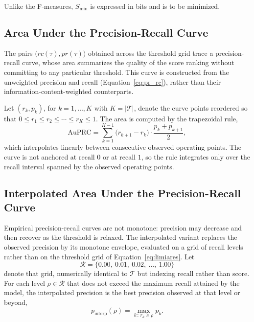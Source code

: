 \documentclass[Ingles]{ic-tese-v3}
\begin{document}
Unlike the F-measures, $S_{\min}$ is expressed in bits and is to be minimized.

\subsection{Area Under the Precision-Recall Curve}
\label{subsec:auprc}

The pairs $\bigl(rc(\tau), pr(\tau)\bigr)$ obtained across the threshold grid
trace a precision-recall curve, whose area summarizes the quality of the score
ranking without committing to any particular threshold. This curve is constructed
from the unweighted precision and recall (Equation~\ref{eq:pr_rc}), rather than
their information-content-weighted counterparts.

Let $(r_k, p_k)$, for $k = 1, \ldots, K$ with $K = |\mathcal{T}|$, denote the
curve points reordered so that $0 \leq r_1 \leq r_2 \leq \cdots \leq r_K \leq 1$.
The area is computed by the trapezoidal rule,
\begin{equation}
\label{eq:auprc}
\mathrm{AuPRC} = \sum_{k=1}^{K-1} \bigl(r_{k+1} - r_k\bigr)
\cdot \frac{p_k + p_{k+1}}{2},
\end{equation}
\noindent which interpolates linearly between consecutive observed operating points. The
curve is not anchored at recall $0$ or at recall $1$, so the rule integrates only
over the recall interval spanned by the observed operating points.

\subsection{Interpolated Area Under the Precision-Recall Curve}
\label{subsec:iauprc}

Empirical precision-recall curves are not monotone: precision may decrease and
then recover as the threshold is relaxed. The interpolated variant replaces the
observed precision by its monotone envelope, evaluated on a grid of recall levels
rather than on the threshold grid of Equation~\ref{eq:limiares}. Let
\begin{equation}
\label{eq:grade_recall}
\mathcal{R} = \{0.00,\ 0.01,\ 0.02,\ \ldots,\ 1.00\}
\end{equation}
\noindent denote that grid, numerically identical to $\mathcal{T}$ but indexing recall
rather than score. For each level $\rho \in \mathcal{R}$ that does not exceed the
maximum recall attained by the model, the interpolated precision is the best
precision observed at that level or beyond,
\begin{equation}
\label{eq:iauprc}
p_{\mathrm{interp}}(\rho) = \max_{k \,:\, r_k \geq \rho} p_k.
\end{equation}
\end{document}
